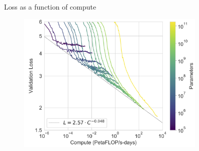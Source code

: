 
\begin{vbframe}{Loss as a function of compute}

\vfill

	\begin{figure}
		\centering
		\includegraphics[width=9cm]{figure/losscompute.png}
	\end{figure}

\vfill

\end{vbframe}


\endlecture

